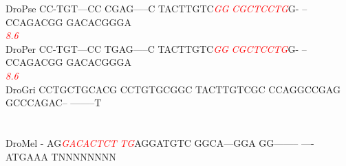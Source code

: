 \documentclass[11pt,twoside,reqno,a4paper]{article}
\begin{document}
{DroPse	CC-TGT---CC	CGAG-----C	TACTTGTC\textit{\textcolor{Red}{G}}\textit{\textcolor{Red}{G}}	\textit{\textcolor{Red}{C}}\textit{\textcolor{Red}{G}}\textit{\textcolor{Red}{C}}\textit{\textcolor{Red}{T}}\textit{\textcolor{Red}{C}}\textit{\textcolor{Red}{C}}\textit{\textcolor{Red}{T}}\textit{\textcolor{Red}{G}}G-	--CCAGACGG	GACACGGGA\\
\hspace*{7\charwidth}\hspace*{1\charwidth}\hspace*{1\charwidth}\hspace*{29\charwidth}\textit{\textcolor{Red}{8.6}}\hspace*{1\charwidth}\hspace*{1\charwidth}\hspace*{1\charwidth}\\
DroPer	CC-TGT---CC	TGAG-----C	TACTTGTC\textit{\textcolor{Red}{G}}\textit{\textcolor{Red}{G}}	\textit{\textcolor{Red}{C}}\textit{\textcolor{Red}{G}}\textit{\textcolor{Red}{C}}\textit{\textcolor{Red}{T}}\textit{\textcolor{Red}{C}}\textit{\textcolor{Red}{C}}\textit{\textcolor{Red}{T}}\textit{\textcolor{Red}{G}}G-	--CCAGACGG	GACACGGGA\\
\hspace*{7\charwidth}\hspace*{1\charwidth}\hspace*{1\charwidth}\hspace*{29\charwidth}\textit{\textcolor{Red}{8.6}}\hspace*{1\charwidth}\hspace*{1\charwidth}\hspace*{1\charwidth}\\
DroGri	CCTGCTGCACG	CCTGTGCGGC	TACTTGTCGC	CCAGGCCGAG	GCCCAGAC--	--------T\\
\hspace*{7\charwidth}\hspace*{1\charwidth}\hspace*{1\charwidth}\hspace*{1\charwidth}\hspace*{1\charwidth}\hspace*{1\charwidth}\\
\\
DroMel	-	AG\textit{\textcolor{Red}{G}}\textit{\textcolor{Red}{A}}\textit{\textcolor{Red}{C}}\textit{\textcolor{Red}{A}}\textit{\textcolor{Red}{C}}\textit{\textcolor{Red}{T}}\textit{\textcolor{Red}{C}}\textit{\textcolor{Red}{T}}	\textit{\textcolor{Red}{T}}\textit{\textcolor{Red}{G}}AGGATGTC	GGCA---GGA	GG--------	----ATGAAA	TNNNNNNNN\\
}
\end{document}
